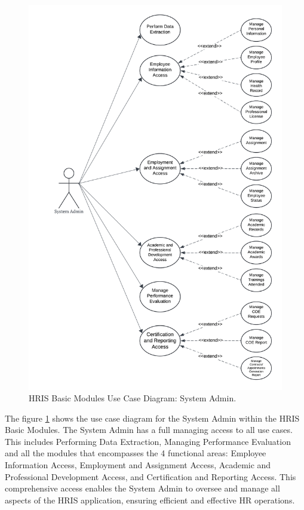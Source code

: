     \begin{figure}[H]
        \centering
        \includegraphics[width=0.9\linewidth]{figures/images/use-case-basic-1.png}
        \caption{HRIS Basic Modules Use Case Diagram: System Admin.}
        \label{fig:use-case-basic-1}
    \end{figure}

    The figure \ref{fig:use-case-basic-1} shows the use case diagram for the System Admin within the HRIS Basic Modules. The System Admin has a full managing access to all use cases. This includes Performing Data Extraction, Managing Performance Evaluation and all the modules that encompasses the 4 functional areas: Employee Information Access, Employment and Assignment Access, Academic and Professional Development Access, and Certification and Reporting Access. This comprehensive access enables the System Admin to oversee and manage all aspects of the HRIS application, ensuring efficient and effective HR operations.

